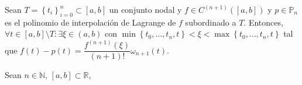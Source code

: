 \begin{frame}
    \begin{theorem}
        Sean
        \begin{math}
            T=
            {
            \left\{
            t_{i}
            \right\}
            }^{n}_{i=0}\subset
            \left[a,b\right]
        \end{math}
        un conjunto nodal y
        \begin{math}
            f\in C^{\left(n+1\right)}
            \left(\left[a,b\right]\right)
        \end{math}
        y
        \begin{math}
            p\in\mathbb{P}_{n}
        \end{math}
        es el polinomio de interpolación de Lagrange de $f$
        subordinado a $T$.
        Entonces,
        \begin{math}
            \forall t\in\left[a,b\right]\setminus T:
            \exists\xi\in\left(a,b\right)
        \end{math}
        con
        \begin{math}
            \min\left\{t_{0},\dotsc,t_{n},t\right\}
            <
            \xi
            <
            \max\left\{t_{0},\dotsc,t_{n},t\right\}
        \end{math}
        tal que
        \begin{math}
            f\left(t\right)-
            p\left(t\right)=
            \dfrac{
                f^{\left(n+1\right)}\left(\xi\right)
            }{
                \left(n+1\right)!
            }
            \omega_{n+1}\left(t\right)
        \end{math}.
    \end{theorem}
    \begin{theorem}
        Sean $n\in\mathbb{N}$, $\left[a,b\right]\subset\mathbb{R}$,

\end{theorem}
\end{frame}
